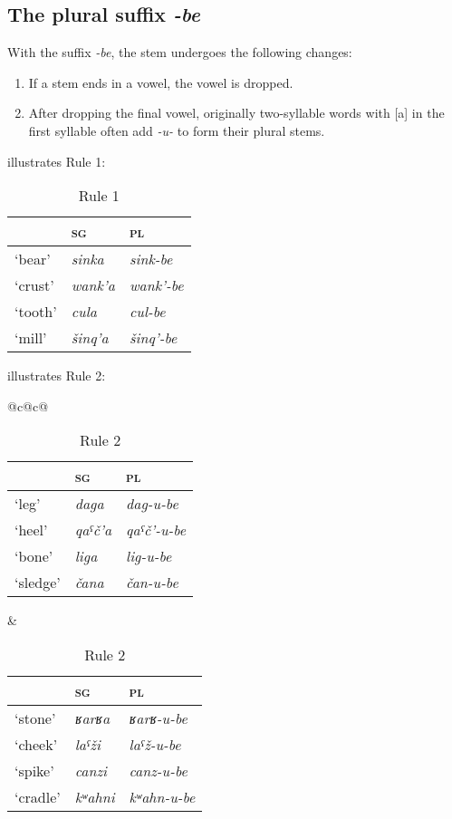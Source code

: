 ﻿\documentclass[output=paper]{langsci/langscibook}
\begin{document}

\subsection{The plural suffix \emph{-be}}
\label{the-plural-suffix--be}

With the suffix \emph{-be}, the stem undergoes the following changes:

\begin{enumerate}[topsep=\medskipamount,itemsep=0pt,partopsep=0pt,parsep=0pt,label={\arabic*})]
\item %
  If a stem ends in a vowel, the vowel is dropped.

\item %
  After dropping the final vowel, originally two-syllable words with
[a] in the first syllable often add \emph{-u-} to form their plural
stems.
\end{enumerate}

 illustrates Rule 1:

\begin{table}[h]
  \caption{Rule 1}\label{tab:3:13}
  \begin{tabular}{@{}lll@{}}
\toprule
& \textsc{sg} & \textsc{pl}\tabularnewline\midrule
`bear' & \emph{sinka} & \emph{sink-be}\tabularnewline
`crust' & \emph{wank'a} & \emph{wank'-be}\tabularnewline
`tooth' & \emph{cula} & \emph{cul-be}\tabularnewline
`mill' & \emph{šinq'a} & \emph{šinq'-be}\tabularnewline
\bottomrule
\end{tabular}
\end{table}


 illustrates Rule 2:

\begin{table}[H]
  \caption{Rule 2}\label{tab:3:14}
\begin{tabular}{@{}c@{\qquad}c@{}}
\toprule
  \begin{tabular}{@{}lll@{}}
& \textsc{sg} & \textsc{pl}\tabularnewline \midrule 
`leg' & \emph{daga} & \emph{dag-u-be}\tabularnewline
`heel' & \emph{qaˤč'a} & \emph{qaˤč'-u-be}\tabularnewline
`bone' & \emph{liga} & \emph{lig-u-be}\tabularnewline
`sledge' & \emph{čana} & \emph{čan-u-be}\tabularnewline
  \end{tabular}&
  \begin{tabular}{@{}lll@{}}
& \textsc{sg} & \textsc{pl}\tabularnewline \midrule 
 `stone' & \emph{ʁarʁa} & \emph{ʁarʁ-u-be}\tabularnewline
 `cheek' & \emph{laˤži} & \emph{laˤž-u-be}\tabularnewline
 `spike' & \emph{canzi} & \emph{canz-u-be}\tabularnewline
 `cradle' & \emph{kʷahni} & \emph{kʷahn-u-be}\tabularnewline
  \end{tabular}\tabularnewline
 \bottomrule
  \end{tabular}
\end{table}
\end{document}
